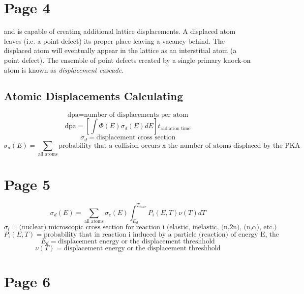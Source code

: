 \documentclass[11pt]{article}
\begin{document}
\section{Page 4}
and is capable of creating additional lattice displacements. A displaced atom leaves (i.e. a point defect) its proper place leaving a vacancy behind. The displaced atom will eventually appear in the lattice as an interstitial atom (a point defect). The ensemble of point defects created by a single primary knock-on atom is known as \textit{displacement cascade}.

\subsection{Atomic Displacements Calculating}
\begin{equation}
	\text{dpa} = \text{number of displacements per atom}
\end{equation}
\begin{equation}
	\text{dpa} = \left[ \int \Phi(E) \sigma_d (E) dE \right] t_{\text{radiation time}}
\end{equation}
\begin{equation}
	\sigma_d = \text{displacement cross section}
\end{equation}
\begin{equation}
	\sigma_d(E) = \sum_{\text{all atoms}} \text{probability that a collision occurs x the number of atoms displaced by the PKA}
\end{equation}

\section{Page 5}
\begin{equation}
	\sigma_d(E) = \sum_{\text{all atoms}} \sigma_e (E) \int_{E_d}^{T_{max}} P_i(E,T) \nu(T) dT
\end{equation}
\begin{equation}
	\sigma_i = \text{(nuclear) microscopic cross section for reaction i (elastic, inelastic, (n,2n), (n,$\alpha$), etc.)}
\end{equation}
\begin{equation}
	P_i(E,T) = \text{probability that in reaction i induced by a particle (reaction) of energy E, the PKA has a kinetic energy T}
\end{equation}
\begin{equation}
	E_d = \text{displacement energy or the displacement threshhold}
\end{equation}
\begin{equation}
	\nu(T) = \text{displacement energy or the displacement threshhold}
\end{equation}

\section{Page 6}
\end{document}
